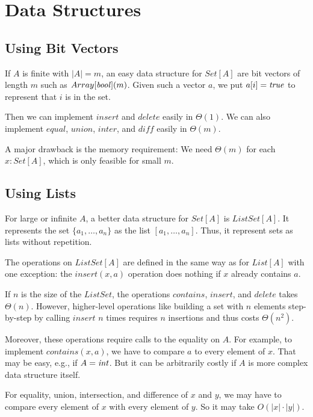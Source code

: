 \section{Data Structures}

\subsection{Using Bit Vectors}\label{sec:ad:vectorset}

If $A$ is finite with $|A|=m$, an easy data structure for $Set[A]$ are bit vectors of length $m$ such as $Array[\mathit{bool}](m)$.
Given such a vector $a$, we put $a[i]=\mathit{true}$ to represent that $i$ is in the set.

Then we can implement $insert$ and $delete$ easily in $\Theta(1)$.
We can also implement $equal$, $union$, $inter$, and $diff$ easily in $\Theta(m)$.

A major drawback is the memory requirement: We need $\Theta(m)$ for each $x:Set[A]$, which is only feasible for small $m$.

\subsection{Using Lists}\label{sec:ad:listset}

For large or infinite $A$, a better data structure for $Set[A]$ is $ListSet[A]$.
It represents the set $\{a_1,\ldots,a_n\}$ as the list $[a_1,\ldots,a_n]$.
Thus, it represent sets as lists without repetition.

The operations on $ListSet[A]$ are defined in the same way as for $List[A]$ with one exception: the $insert(x,a)$ operation does nothing if $x$ already contains $a$.
\medskip

If $n$ is the size of the $ListSet$, the operations $contains$, $insert$, and $delete$ takes $\Theta(n)$.
However, higher-level operations like building a set with $n$ elements  step-by-step by calling $insert$ $n$ times requires $n$ insertions and thus costs $\Theta(n^2)$.

Moreover, these operations require calls to the equality on $A$.
For example, to implement $contains(x,a)$, we have to compare $a$ to every element of $x$.
That may be easy, e.g., if $A=\mathit{int}$.
But it can be arbitrarily costly if $A$ is more complex data structure itself.

For equality, union, intersection, and difference of $x$ and $y$, we may have to compare every element of $x$ with every element of $y$.
So it may take $O(|x|\cdot|y|)$.

